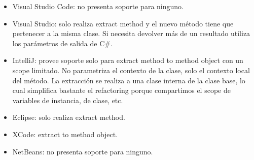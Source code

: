 \begin{itemize}
    \item Visual Studio Code: no presenta soporte para ninguno.
    \item Visual Studio: solo realiza extract method y el nuevo método tiene que pertenecer a la
misma clase. Si necesita devolver más de un resultado utiliza los parámetros de salida de C\#.
    \item IntelliJ: provee soporte solo para extract method to method object con un scope limitado.
    No parametriza el contexto de la clase, solo el contexto local del método. La extracción se realiza a una clase 
    interna de la clase base, lo cual simplifica bastante el refactoring porque compartimos el scope de
    variables de instancia, de clase, etc.
    \item Eclipse: solo realiza extract method.
    \item XCode: extract to method object.
    \item NetBeans: no presenta soporte para ninguno.
\end{itemize}